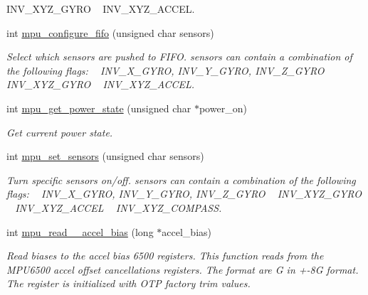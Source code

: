 \begin{DoxyCompactItemize}
\begin{DoxyCompactList}
 I\+N\+V\+\_\+\+X\+Y\+Z\+\_\+\+G\+Y\+RO ~\newline
 I\+N\+V\+\_\+\+X\+Y\+Z\+\_\+\+A\+C\+C\+EL. \end{DoxyCompactList}\item 
int \hyperlink{group___d_r_i_v_e_r_s_gababbdda287e1f19323489f90a0889dd7}{mpu\+\_\+configure\+\_\+fifo} (unsigned char sensors)
\begin{DoxyCompactList}\small\item\em Select which sensors are pushed to F\+I\+FO. {\itshape sensors} can contain a combination of the following flags\+: ~\newline
 I\+N\+V\+\_\+\+X\+\_\+\+G\+Y\+RO, I\+N\+V\+\_\+\+Y\+\_\+\+G\+Y\+RO, I\+N\+V\+\_\+\+Z\+\_\+\+G\+Y\+RO ~\newline
 I\+N\+V\+\_\+\+X\+Y\+Z\+\_\+\+G\+Y\+RO ~\newline
 I\+N\+V\+\_\+\+X\+Y\+Z\+\_\+\+A\+C\+C\+EL. \end{DoxyCompactList}\item 
int \hyperlink{group___d_r_i_v_e_r_s_gaec8fa7a067988d174516bb735a4a0bc9}{mpu\+\_\+get\+\_\+power\+\_\+state} (unsigned char $\ast$power\+\_\+on)
\begin{DoxyCompactList}\small\item\em Get current power state. \end{DoxyCompactList}\item 
int \hyperlink{group___d_r_i_v_e_r_s_ga6e77e7cc1cf6be5e8fdf617c5b4586d1}{mpu\+\_\+set\+\_\+sensors} (unsigned char sensors)
\begin{DoxyCompactList}\small\item\em Turn specific sensors on/off. {\itshape sensors} can contain a combination of the following flags\+: ~\newline
 I\+N\+V\+\_\+\+X\+\_\+\+G\+Y\+RO, I\+N\+V\+\_\+\+Y\+\_\+\+G\+Y\+RO, I\+N\+V\+\_\+\+Z\+\_\+\+G\+Y\+RO ~\newline
 I\+N\+V\+\_\+\+X\+Y\+Z\+\_\+\+G\+Y\+RO ~\newline
 I\+N\+V\+\_\+\+X\+Y\+Z\+\_\+\+A\+C\+C\+EL ~\newline
 I\+N\+V\+\_\+\+X\+Y\+Z\+\_\+\+C\+O\+M\+P\+A\+SS. \end{DoxyCompactList}\item 
int \hyperlink{group___d_r_i_v_e_r_s_ga57bfbb356ce449135ce39659455041ae}{mpu\+\_\+read\+\_\+\_\+accel\+\_\+bias} (long $\ast$accel\+\_\+bias)
\begin{DoxyCompactList}\small\item\em Read biases to the accel bias 6500 registers. This function reads from the M\+P\+U6500 accel offset cancellations registers. The format are G in +-\/8G format. The register is initialized with O\+TP factory trim values. \end{DoxyCompactList}\item 

\end{DoxyCompactItemize}
